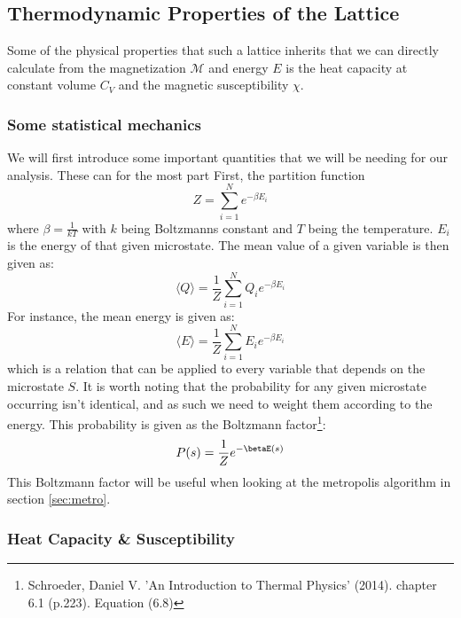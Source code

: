 \documentclass[reprint,english,notitlepage]{revtex4-1}  %
\begin{document}
\subsection{Thermodynamic Properties of the Lattice}

Some of the physical properties that such a lattice inherits that we can directly calculate from the magnetization $\mathcal{M}$ and energy $E$ is the heat capacity at constant volume $C_V$ and the magnetic susceptibility $\chi$.

\subsubsection{Some statistical mechanics}

We will first introduce some important quantities that we will be needing for our analysis. These can for the most part  First, the partition function
\begin{equation}\label{eq:partition}
    Z = \sum\limits_{i=1}^N e^{-\beta E_i}
\end{equation}
where $\beta = \frac{1}{kT}$ with $k$ being Boltzmanns constant and $T$ being the temperature. $E_i$ is the energy of that given microstate. The mean value of a given variable is then given as:
\begin{equation}\label{eq:generalmean}
    \langle Q \rangle = \frac{1}{Z}\sum\limits_{i=1}^N Q_ie^{-\beta E_i}
\end{equation}
For instance, the mean energy is given as:
\begin{equation}
    \langle E \rangle = \frac{1}{Z}\sum\limits_{i=1}^N E_ie^{-\beta E_i}
\end{equation}
which is a relation that can be applied to every variable that depends on the microstate $S$. It is worth noting that the probability for any given microstate occurring isn't identical, and as such we need to weight them according to the energy. This probability is given as the Boltzmann factor\footnote{Schroeder, Daniel V. 'An Introduction to Thermal Physics' (2014). chapter 6.1 (p.223). Equation (6.8)}:
\begin{equation}\label{eq:boltzmann}
    P(s) = \frac{1}{Z}e^{-\betaE(s)}
\end{equation}
This Boltzmann factor will be useful when looking at the metropolis algorithm in section \ref{sec:metro}.

\subsubsection{Heat Capacity \& Susceptibility}
\end{document}
